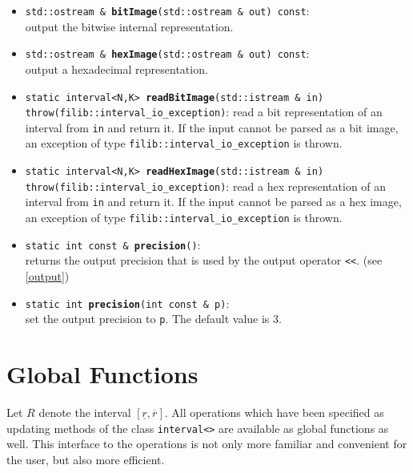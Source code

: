 \documentclass{report}
\begin{document}
\begin{itemize}

			\item \texttt{std::ostream \& {\bf bitImage}(std::ostream \& out) const}:\\
				output the bitwise internal representation.

			\item \texttt{std::ostream \& {\bf hexImage}(std::ostream \& out) const}:\\
				output a hexadecimal representation.

			\item \texttt{static interval<N,K> {\bf readBitImage}(std::istream \& in)\\
			throw(filib::interval\_io\_exception)}:
				read a bit representation of an interval from \texttt{in}
				and return it. If the input cannot be parsed
as a bit image, an exception of type \texttt{filib::interval\_io\_exception} is
thrown.

			\item \texttt{static interval<N,K> {\bf readHexImage}(std::istream \& in)\\
			throw(filib::interval\_io\_exception)}:
				read a hex representation of an interval from \texttt{in}
				and return it. If the input cannot be parsed
as a hex image, an exception of type \texttt{filib::interval\_io\_exception} is
thrown.
				
			\item \texttt{static int const \& {\bf precision}()}:\\
				returns the output precision that is
				used by the output operator
				\texttt{<<}. (see \ref{output})
			\item \texttt{static int {\bf precision}(int const \& p)}:\\
				set the output precision to \texttt{p}. The
				default value is 3.
	
		\end{itemize}
	\chapter{Global Functions}
Let $R$ denote the interval $[\underline{r},\overline{r}]$.
All operations which have been specified as updating methods of the class
				\texttt{interval<>} are available as global
				functions as well. This interface to
				the operations is not only more
				familiar and convenient for the user,
				but also more efficient.
\end{document}
